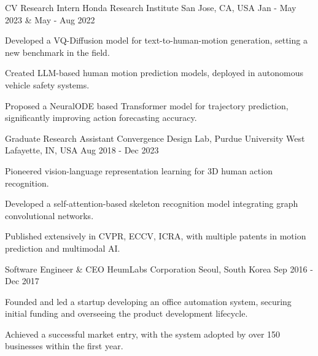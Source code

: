 \begin{cventries}
\cventry
{CV Research Intern} %
{Honda Research Institute} %
{San Jose, CA, USA} %
{Jan - May 2023 \& May - Aug 2022} %
{ %
\begin{cvitems}
    \item Developed a VQ-Diffusion model for text-to-human-motion generation, setting a new benchmark in the field.
	\item Created LLM-based human motion prediction models, deployed in autonomous vehicle safety systems.
	\item Proposed a NeuralODE based Transformer model for trajectory prediction, significantly improving action forecasting accuracy.
\end{cvitems}
}

\cventry
{Graduate Research Assistant} %
{Convergence Design Lab, Purdue University} %
{West Lafayette, IN, USA} %
{Aug 2018 - Dec 2023} %
{ %
\begin{cvitems}
    \item Pioneered vision-language representation learning for 3D human action recognition.
	\item Developed a self-attention-based skeleton recognition model integrating graph convolutional networks.
	\item Published extensively in CVPR, ECCV, ICRA, with multiple patents in motion prediction and multimodal AI.
\end{cvitems}
}

\cventry
{Software Engineer \& CEO} %
{HeumLabs Corporation} %
{Seoul, South Korea} %
{Sep 2016 - Dec 2017} %
{ %
\begin{cvitems}
    \item Founded and led a startup developing an office automation system, securing initial
        funding and overseeing the product development lifecycle.
    \item Achieved a successful market entry, with the system adopted by over 150 businesses within the first year.
\end{cvitems}
}
%
%

\end{cventries}
